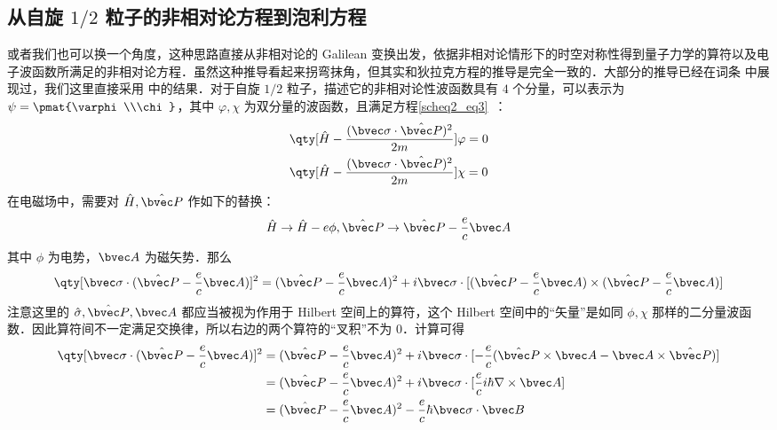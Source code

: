 \subsection{从自旋 $1/2$ 粒子的非相对论方程到泡利方程}
或者我们也可以换一个角度，这种思路直接从非相对论的 Galilean 变换出发\cite{刘觉平}，依据非相对论情形下的时空对称性得到量子力学的算符以及电子波函数所满足的非相对论方程．虽然这种推导看起来拐弯抹角，但其实和狄拉克方程的推导是完全一致的．大部分的推导已经在词条  中展现过，我们这里直接采用 中的结果．对于自旋 $1/2$ 粒子，描述它的非相对论性波函数具有 $4$ 个分量，可以表示为 $\psi=\pmat{\varphi\\\chi}$，其中 $\varphi,\chi$ 为双分量的波函数，且满足方程\autoref{scheq2_eq3}~：
\begin{equation}
\begin{aligned}
&\qty[\hat H-\frac{(\bvec \sigma\cdot \hat{\bvec P})^2}{2m}]\varphi=0\\
&
\qty[\hat H-\frac{(\bvec \sigma\cdot \hat{\bvec P})^2}{2m}]\chi=0
\end{aligned}
\end{equation}
在电磁场中，需要对 $\hat H,\hat{\bvec P}$ 作如下的替换：
\begin{equation}
\hat H\rightarrow \hat H-e\phi, \hat{\bvec P}\rightarrow \hat{\bvec P}-\frac{e}{c}\bvec A
\end{equation}
其中 $\phi$ 为电势，$\bvec A$ 为磁矢势．那么
\begin{equation}\label{Pauli_eq1}
\qty[\bvec \sigma\cdot(\hat{\bvec P}-\frac{e}{c}\bvec A)]^2=(\hat{\bvec P}-\frac{e}{c}\bvec A)^2+i\bvec \sigma\cdot[(\hat{\bvec P}-\frac{e}{c}\bvec A)\times (\hat{\bvec P}-\frac{e}{c}\bvec A)]
\end{equation}
注意这里的 $\hat \sigma,\hat{\bvec P},\bvec A$ 都应当被视为作用于 Hilbert 空间上的算符，这个 Hilbert 空间中的“矢量”是如同 $\phi,\chi$ 那样的二分量波函数．因此算符间不一定满足交换律，所以右边的两个算符的“叉积”不为 $0$．计算可得
\begin{equation}
\begin{aligned}
\qty[\bvec \sigma \cdot (\hat{\bvec P}-\frac{e}{c}\bvec A)]^2
&=(\hat{\bvec P}-\frac{e}{c}\bvec A)^2+i\bvec \sigma\cdot[-\frac{e}{c}(\hat{\bvec P}\times \bvec A- \bvec A\times \hat{\bvec P})]\\
&=(\hat{\bvec P}-\frac{e}{c}\bvec A)^2+i\bvec \sigma\cdot[\frac{e}{c}i\hbar \nabla \times  \bvec A]\\
&=(\hat{\bvec P}-\frac{e}{c}\bvec A)^2-\frac{e}{c}\hbar\bvec \sigma\cdot \bvec B
\end{aligned}
\end{equation}
